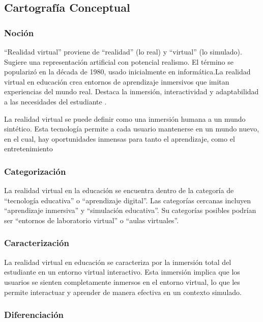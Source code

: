 \subsection{Cartografía Conceptual}

\subsubsection{Noción}

“Realidad virtual” proviene de “realidad” (lo real) y “virtual” (lo simulado). Sugiere una representación artificial con potencial realismo. El término se popularizó en la década de 1980, usado inicialmente en informática.La realidad virtual en educación crea entornos de aprendizaje inmersivos que imitan experiencias del mundo real. Destaca la inmersión, interactividad y adaptabilidad a las necesidades del estudiante \parencite{zheng1998virtual}.

La realidad virtual se puede definir como una inmersi{\'o}n humana a un mundo sint{\'e}tico. Esta tecnolog{\'i}a permite a cada usuario mantenerse en un mundo nuevo, en el cual, hay oportunidades inmensas para tanto el aprendizaje, como el entretenimiento\parencite{elmqaddem2019augmented}
\subsubsection{Categorización}

La realidad virtual en la educación se encuentra dentro de la categoría de “tecnología educativa” o “aprendizaje digital”. Las categorías cercanas incluyen “aprendizaje inmersiva” y “simulación educativa”. Su categorías posibles podrían ser “entornos de laboratorio virtual” o “aulas virtuales”. \parencite{barahona2019cospaces, marin2022realidad}

\subsubsection{Caracterización}

La realidad virtual en educación se caracteriza por la inmersión total del estudiante en un entorno virtual interactivo. Esta inmersión implica que los usuarios se sienten completamente inmersos en el entorno virtual, lo que les permite interactuar y aprender de manera efectiva en un contexto simulado. \parencite{zamudio2021realidad}



\subsubsection{Diferenciación}

